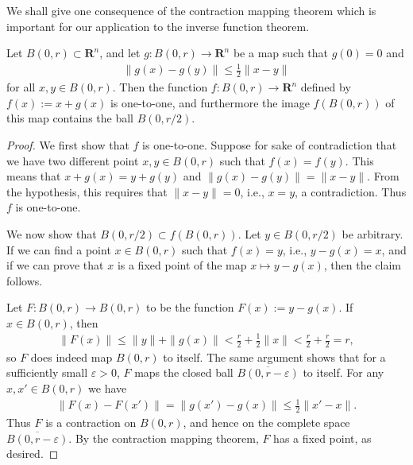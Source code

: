 We shall give one consequence of the contraction mapping theorem which is important for our application to the inverse function theorem. %

\begin{lemma}\label{lem:lemma of the inverse function theorem}
    Let $B(0, r) \subset \mathbf{R}^n$, and let $g : B(0, r) \to \mathbf{R}^n$ be a map such that $g(0) = 0$ and
        \begin{align*}
            \|g(x) - g(y)\| \leq \frac{1}{2}\|x - y\|
        \end{align*}
    for all $x, y \in B(0, r)$. Then the function $f : B(0, r) \to \mathbf{R}^n$ defined by $f(x) := x + g(x)$ is one-to-one, and furthermore the image $f(B(0, r))$ of this map contains the ball $B(0, r/2)$.
\end{lemma}

\begin{proof}
    We first show that $f$ is one-to-one. Suppose for sake of contradiction that we have two different point $x, y \in B(0, r)$ such that $f(x) = f(y)$. This means that $x + g(x) = y + g(y)$ and $\|g(x) - g(y)\| = \|x - y\|$. From the hypothesis, this requires that $\|x - y\| = 0$, i.e., $x = y$, a contradiction. Thus $f$ is one-to-one.

    We now show that $B(0, r/2) \subset f(B(0, r))$. Let $y \in B(0, r/2)$ be arbitrary. If we can find a point $x \in B(0, r)$ such that $f(x) = y$, i.e., $y - g(x) = x$, and if we can prove that $x$ is a fixed point of the map $x \mapsto y - g(x)$, then the claim follows.

    Let $F : B(0, r) \to B(0, r)$ to be the function $F(x) := y - g(x)$. If $x \in B(0, r)$, then
        \begin{align*}
            \|F(x)\| \leq \|y\| + \|g(x)\| < \frac{r}{2} + \frac{1}{2}\|x\| < \frac{r}{2} + \frac{r}{2} = r,
        \end{align*}
    so $F$ does indeed map $B(0, r)$ to itself. The same argument shows that for a sufficiently small $\varepsilon > 0$, $F$ maps the closed ball $\overline{B(0, r - \varepsilon)}$ to itself. For any $x, x' \in B(0, r)$ we have
        \begin{align*}
            \|F(x) - F(x')\|
            = \|g(x') - g(x)\|
            \leq \frac{1}{2}\|x' - x\|.
        \end{align*}
    Thus $F$ is a contraction on $B(0, r)$, and hence on the complete space $\overline{B(0, r - \varepsilon)}$. By the contraction mapping theorem, $F$ has a fixed point, as desired.
\end{proof}

